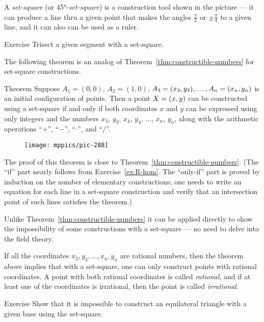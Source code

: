 A \emph{set-square} (or 45°-{}\emph{set-square}) is a construction tool shown in the picture ---
it can produce a line thru a given point
that makes the angles
$\tfrac\pi2$ or $\pm\tfrac\pi4$ 
to a given line, and it can also can be used as a ruler.

\begin{thm}{Exercise}\label{ex:trisect-set-square}
Trisect a given segment with a set-square.
\end{thm}

The following theorem is an analog of Theorem~\ref{thm:constructible-numbers} for set-square constructions.

\begin{thm}{Theorem}\label{thm:set-square-constructible-numbers}
Suppose $A_1 = (0, 0)$, $A_2 = (1, 0)$, $A_3 = (x_3, y_3), \dots, A_n = (x_n, y_n)$ is
an initial configuration of points.
Then a point $X = (x, y)$ can be constructed using a set-square if and only if both coordinates $x$ and $y$
can be expressed using only integers and the numbers $x_3$, $y_3$, $x_4$, $y_4$, $\dots$, $x_n$, $y_n$,
along with the arithmetic operations ``$+$'', ``$-$'', ``$\cdot$'', and ``$/$''.
\end{thm}


\begin{wrapfigure}{о}{26mm}
\vskip-2mm
\centering
\texttt{[image: mppics/pic-288]}
\end{wrapfigure}

The proof of this theorem is close to Theorem~\ref{thm:constructible-numbers}.
(The ``if'' part nearly follows from Exercise~\ref{ex:R-hom}.
The ``only-if'' part is proved by induction on the number of elementary constructions; one needs to write an equation for each line in a set-square construction and verify that an intersection point of such lines satisfies the theorem.)

Unlike Theorem~\ref{thm:constructible-numbers} it can be applied directly to show the impossibility of some constructions with a set-square --- no need to delve into the field theory.

If all the coordinates $x_3,y_3,\dots,x_n,y_n$ are rational numbers, then the theorem above implies that with a set-square, one can only construct points with rational coordinates.
A point with both rational coordinates is called \emph{rational},
and if at least one of the coordinates is irrational, then the point is called \emph{irrational}.

\begin{thm}{Exercise}\label{ex:equilateral triangle}
Show that it is impossible to construct an equilateral triangle with a given base using
the set-square.
\end{thm}

